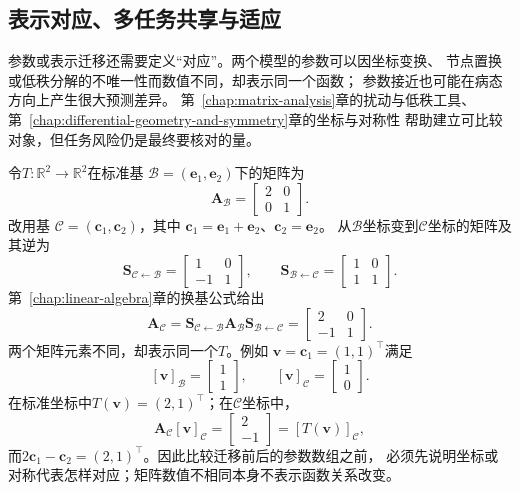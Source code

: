 \subsection{表示对应、多任务共享与适应}
\label{sec:future-representation-multitask-adaptation}

参数或表示迁移还需要定义“对应”。两个模型的参数可以因坐标变换、
节点置换或低秩分解的不唯一性而数值不同，却表示同一个函数；
参数接近也可能在病态方向上产生很大预测差异。
第~\ref{chap:matrix-analysis}章的扰动与低秩工具、
第~\ref{chap:differential-geometry-and-symmetry}章的坐标与对称性
帮助建立可比较对象，但任务风险仍是最终要核对的量。

\begin{example}[同一映射的两组坐标表达]
  \label{ex:future-same-map-two-coordinates}
  令\(T:\mathbb{R}^2\to\mathbb{R}^2\)在标准基
  \(\mathcal B=(\bm e_1,\bm e_2)\)下的矩阵为
  \[
    \bm A_{\mathcal B}
    =
    \begin{bmatrix}
      2&0\\
      0&1
    \end{bmatrix}.
  \]
  改用基
  \(\mathcal C=(\bm c_1,\bm c_2)\)，其中
  \(\bm c_1=\bm e_1+\bm e_2\)、\(\bm c_2=\bm e_2\)。
  从\(\mathcal B\)坐标变到\(\mathcal C\)坐标的矩阵及其逆为
  \[
    \bm S_{\mathcal C\leftarrow\mathcal B}
    =
    \begin{bmatrix}
      1&0\\
      -1&1
    \end{bmatrix},
    \qquad
    \bm S_{\mathcal B\leftarrow\mathcal C}
    =
    \begin{bmatrix}
      1&0\\
      1&1
    \end{bmatrix}.
  \]
  第~\ref{chap:linear-algebra}章的换基公式给出
  \[
    \bm A_{\mathcal C}
    =
    \bm S_{\mathcal C\leftarrow\mathcal B}
    \bm A_{\mathcal B}
    \bm S_{\mathcal B\leftarrow\mathcal C}
    =
    \begin{bmatrix}
      2&0\\
      -1&1
    \end{bmatrix}.
  \]
  两个矩阵元素不同，却表示同一个\(T\)。例如
  \(\bm v=\bm c_1=(1,1)^{\top}\)满足
  \[
    [\bm v]_{\mathcal B}
    =
    \begin{bmatrix}1\\1\end{bmatrix},
    \qquad
    [\bm v]_{\mathcal C}
    =
    \begin{bmatrix}1\\0\end{bmatrix}.
  \]
  在标准坐标中\(T(\bm v)=(2,1)^{\top}\)；在\(\mathcal C\)坐标中，
  \[
    \bm A_{\mathcal C}[\bm v]_{\mathcal C}
    =
    \begin{bmatrix}2\\-1\end{bmatrix}
    =
    [T(\bm v)]_{\mathcal C},
  \]
  而\(2\bm c_1-\bm c_2=(2,1)^{\top}\)。因此比较迁移前后的参数数组之前，
  必须先说明坐标或对称代表怎样对应；矩阵数值不相同本身不表示函数关系改变。
\end{example}

